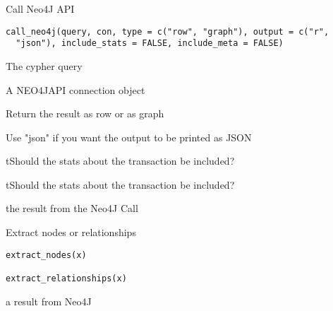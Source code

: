 \documentclass[a4paper]{book}
\begin{document}
%
\begin{Description}\relax
Call Neo4J API
\end{Description}
%
\begin{Usage}
\begin{verbatim}
call_neo4j(query, con, type = c("row", "graph"), output = c("r",
  "json"), include_stats = FALSE, include_meta = FALSE)
\end{verbatim}
\end{Usage}
%
\begin{Arguments}
\begin{ldescription}
\item[\code{query}] The cypher query

\item[\code{con}] A NEO4JAPI connection object

\item[\code{type}] Return the result as row or as graph

\item[\code{output}] Use "json" if you want the output to be printed as JSON

\item[\code{include\_stats}] tShould the stats about the transaction be included?

\item[\code{include\_meta}] tShould the stats about the transaction be included?
\end{ldescription}
\end{Arguments}
%
\begin{Value}
the result from the Neo4J Call
\end{Value}
%
\begin{Description}\relax
Extract nodes or relationships
\end{Description}
%
\begin{Usage}
\begin{verbatim}
extract_nodes(x)

extract_relationships(x)
\end{verbatim}
\end{Usage}
%
\begin{Arguments}
\begin{ldescription}
\item[\code{x}] a result from Neo4J
\end{ldescription}
\end{Arguments}
\end{document}
